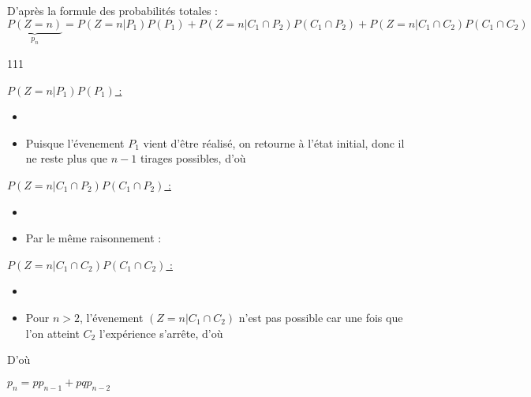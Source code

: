 D'après la formule des probabilités totales :
\[
  \underbrace{P(Z=n)}_{p_n} = P(Z=n|P_1)P(P_1) + P(Z=n|C_1\cap P_2)P(C_1\cap P_2) + P(Z=n|C_1\cap C_2)P(C_1\cap C_2)
\]

\begin{dinglist}{111}
  \item \ul{$P(Z=n|P_1)P(P_1)$ :}
  \begin{itemize}
    \item {}
    \item Puisque l'évenement $P_1$ vient d'être réalisé, on retourne à l'état initial, donc il ne reste plus que $n-1$ tirages possibles, d'où
  \end{itemize}
  \item \ul{$P(Z=n|C_1\cap P_2)P(C_1\cap P_2)$ :}
  \begin{itemize}
    \item {}
    \item Par le même raisonnement : 
  \end{itemize}
  \item \ul{$P(Z=n|C_1\cap C_2)P(C_1\cap C_2)$ :}
  \begin{itemize}
    \item {}
    \item Pour $n>2$, l'évenement $(Z=n|C_1\cap C_2)$ n'est pas possible car une fois que l'on atteint $C_2$ l'expérience s'arrête, d'où 
  \end{itemize}
\end{dinglist}

D'où

\begin{result}
  $p_n = pp_{n-1} + pqp_{n-2}$
\end{result}
